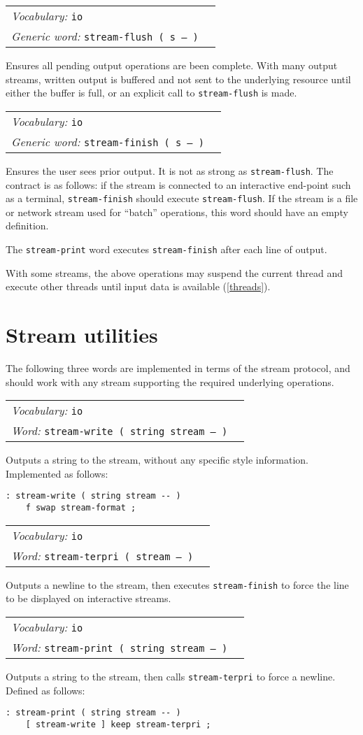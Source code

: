 \documentclass{book}
\newcommand{\vocabulary}[1]{\emph{Vocabulary:} \texttt{#1}&\\}
\newcommand{\ordinaryword}[2]{\index{\texttt{#1}}\emph{Word:} \texttt{#2}&\\}
\newcommand{\genericword}[2]{\index{\texttt{#1}}\emph{Generic word:} \texttt{#2}&\\}
\newcommand{\wordtable}[1]{


\begin{tabularx}{12cm}{lX}
\hline
#1
\hline
\end{tabularx}

}
\begin{document}
\wordtable{
\vocabulary{io}
\genericword{stream-flush}{stream-flush ( s -- )}
}
Ensures all pending output operations are been complete. With many output streams, written output is buffered and not sent to the underlying resource until either the buffer is full, or an explicit call to \texttt{stream-flush} is made.

\wordtable{
\vocabulary{io}
\genericword{stream-finish}{stream-finish ( s -- )}
}
Ensures the user sees prior output. It is not as strong as \texttt{stream-flush}. The contract is as follows: if the stream is connected to an interactive end-point such as a terminal, \texttt{stream-finish} should execute \texttt{stream-flush}. If the stream is a file or network stream used for ``batch'' operations, this word should have an empty definition.

The \texttt{stream-print} word executes \texttt{stream-finish} after each line of output.

With some streams, the above operations may suspend the current thread and execute other threads until input data is available (\ref{threads}).

\section{Stream utilities}

The following three words are implemented in terms of the stream protocol, and should work with any stream supporting the required underlying operations.

\wordtable{
\vocabulary{io}
\ordinaryword{stream-write}{stream-write ( string stream -- )}
}
Outputs a string to the stream, without any specific style information. Implemented as follows:
\begin{verbatim}
: stream-write ( string stream -- )
    f swap stream-format ;
\end{verbatim}
\wordtable{
\vocabulary{io}
\ordinaryword{stream-terpri}{stream-terpri ( stream -- )}
}
Outputs a newline to the stream, then executes \texttt{stream-finish} to force the line to be displayed on interactive streams.
\wordtable{
\vocabulary{io}
\ordinaryword{stream-print}{stream-print ( string stream -- )}
}
Outputs a string to the stream, then calls \verb|stream-terpri| to force a newline. Defined as follows:
\begin{verbatim}
: stream-print ( string stream -- )
    [ stream-write ] keep stream-terpri ;
\end{verbatim}
\end{document}
